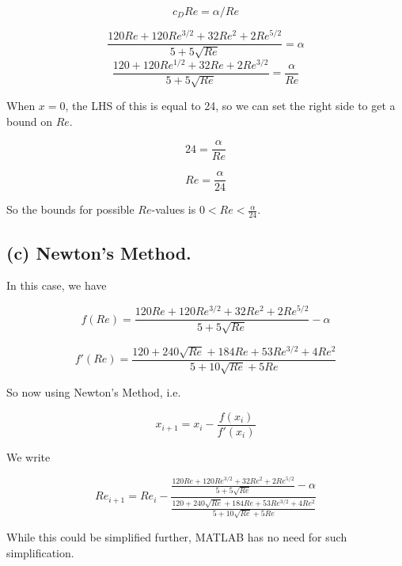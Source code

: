 \documentclass{article}[12pt]
\begin{document}
\begin{center}
\end{center}

$$c_D Re = \alpha / Re$$

$$\frac{120Re + 120 Re^{3/2} + 32 Re^2 + 2 Re^{5/2}}{5 + 5 \sqrt{Re}} = \alpha$$
$$\frac{120 + 120 Re^{1/2} + 32 Re + 2 Re^{3/2}}{5 + 5 \sqrt{Re}} = \frac{\alpha}{Re}$$

When $x=0$, the LHS of this is equal to 24, so we can set the right side to get a bound on $Re$.

$$24 = \frac{\alpha}{Re}$$

$$Re = \frac{\alpha}{24}$$

So the bounds for possible $Re$-values is $0 < Re < \frac{\alpha}{24}$.

\subsection*{(c) \normalsize Newton's Method.}

In this case, we have 

$$f(Re) = \frac{120Re + 120Re^{3/2} + 32Re^2 + 2Re^{5/2}}{5 + 5\sqrt{Re}} - \alpha$$

$$f'(Re) = \frac{120 + 240\sqrt{Re} + 184Re + 53Re^{3/2} + 4Re^2}{5 + 10\sqrt{Re} + 5Re}$$

So now using Newton's Method, i.e.

$$x_{i+1} = x_i - \frac{f(x_i)}{f'(x_i)}$$

We write

$$Re_{i+1} = Re_i - \frac{\frac{120Re + 120Re^{3/2} + 32Re^2 + 2Re^{5/2}}{5 + 5\sqrt{Re}} - \alpha}{\frac{120 + 240\sqrt{Re} + 184Re + 53Re^{3/2} + 4Re^2}{5 + 10\sqrt{Re} + 5Re}}$$


While this could be simplified further, MATLAB has no need for such simplification.

\smallskip
\end{document}
